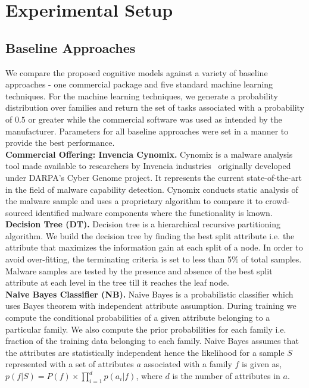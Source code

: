 \documentclass[conference]{IEEEtran}
\def\Pr{p}
\begin{document}
\section{Experimental Setup}

\subsection{Baseline Approaches}
\label{baselineAppr}
We compare the proposed cognitive models against a variety of baseline approaches - one commercial package and five standard machine learning techniques.  For the machine learning techniques, we generate a probability distribution over families and return the set of tasks associated with a probability of $0.5$ or greater while the commercial software was used as intended by the manufacturer.  Parameters for all baseline approaches were set in a manner to provide the best performance.\smallskip\\
\noindent\textbf{Commercial Offering: Invencia Cynomix.}  Cynomix is a malware analysis tool made available to researchers by Invencia industries~\cite{invencia} originally developed under DARPA's Cyber Genome project.  It represents the current state-of-the-art in the field of malware capability detection.  Cynomix conducts static analysis of the malware sample and uses a proprietary algorithm to compare it to crowd-sourced identified malware components where the functionality is known.\smallskip\\
\noindent\textbf{Decision Tree (DT).}  Decision tree is a hierarchical recursive partitioning algorithm. We build the decision tree by finding the best split attribute i.e. the attribute that maximizes the information gain at each split of a node. In order to avoid over-fitting, the terminating criteria is set to less than 5\% of total samples. Malware samples are tested by the presence and absence of the best split attribute at each level in the tree till it reaches the leaf node.\smallskip\\
\noindent\textbf{Naive Bayes Classifier (NB).}  Naive Bayes is a probabilistic classifier which uses Bayes theorem with independent attribute assumption. During training we compute the conditional probabilities of a given attribute belonging to a particular family. We also compute the prior probabilities for each family i.e. fraction of the training data belonging to each family. Naive Bayes assumes that the attributes are statistically independent hence the likelihood for a sample $S$ represented with a set of attributes $a$ associated with a family $f$ is given as, \begin{math} \Pr(f | S) = P(f)\times \prod_{i=1}^{d} \Pr(a_i | f) \end{math}, where $d$ is the number of attributes in $a$.\smallskip\\
\end{document}
